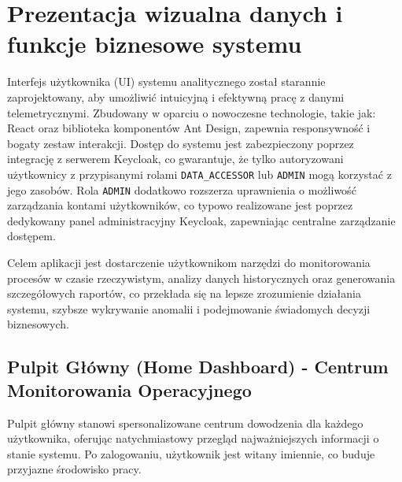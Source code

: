 \section{Prezentacja wizualna danych i funkcje biznesowe systemu}
\label{chap:prezentacja_wizualna}

Interfejs użytkownika (UI) systemu analitycznego został starannie zaprojektowany, aby umożliwić intuicyjną i efektywną pracę z danymi telemetrycznymi. Zbudowany w oparciu o nowoczesne technologie, takie jak: React oraz biblioteka komponentów Ant Design, zapewnia responsywność i bogaty zestaw interakcji. Dostęp do systemu jest zabezpieczony poprzez integrację z serwerem Keycloak, co gwarantuje, że tylko autoryzowani użytkownicy z przypisanymi rolami \texttt{DATA\_ACCESSOR} lub \texttt{ADMIN} mogą korzystać z jego zasobów. Rola \texttt{ADMIN} dodatkowo rozszerza uprawnienia o możliwość zarządzania kontami użytkowników, co typowo realizowane jest poprzez dedykowany panel administracyjny Keycloak, zapewniając centralne zarządzanie dostępem.

Celem aplikacji jest dostarczenie użytkownikom narzędzi do monitorowania procesów w czasie rzeczywistym, analizy danych historycznych oraz generowania szczegółowych raportów, co przekłada się na lepsze zrozumienie działania systemu, szybsze wykrywanie anomalii i podejmowanie świadomych decyzji biznesowych.

\subsection{Pulpit Główny (Home Dashboard) - Centrum Monitorowania Operacyjnego}

Pulpit główny stanowi spersonalizowane centrum dowodzenia dla każdego użytkownika, oferując natychmiastowy przegląd najważniejszych informacji o stanie systemu. Po zalogowaniu, użytkownik jest witany imiennie, co buduje przyjazne środowisko pracy.

